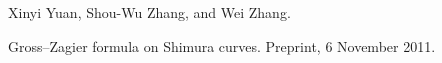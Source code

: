 Xinyi Yuan, Shou-Wu Zhang, and Wei Zhang.

\newblock Gross--Zagier formula on Shimura curves.
\newblock Preprint, 6 November 2011.
